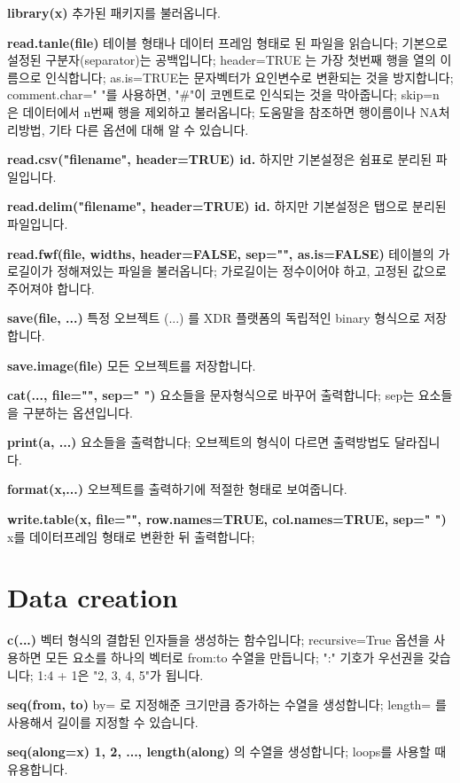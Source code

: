 \documentclass[landscape,twocolumn,letterpaper]{article}
\begin{document}
\textbf{library(x)} 추가된 패키지를 불러옵니다.

\textbf{read.tanle(file)} 테이블 형태나 데이터 프레임 형태로 된 파일을 읽습니다;
	기본으로 설정된 구분자(separator)는 공백입니다;
	header=TRUE 는 가장 첫번째 행을 열의 이름으로 인식합니다;
	as.is=TRUE는 문자벡터가 요인변수로 변환되는 것을 방지합니다;
	comment.char=" "를 사용하면, "\#"이 코멘트로 인식되는 것을 막아줍니다;
	skip=n 은 데이터에서 n번째 행을 제외하고 불러옵니다;
	도움말을 참조하면 행이름이나 NA처리방법, 기타 다른 옵션에 대해 알 수 있습니다.

\textbf{read.csv("filename", header=TRUE) id.} 하지만 기본설정은 쉼표로 분리된 파일입니다.

\textbf{read.delim("filename", header=TRUE) id.} 하지만 기본설정은 탭으로 분리된 파일입니다.

\textbf{read.fwf(file, widths, header=FALSE, sep="", as.is=FALSE)}
	테이블의 가로길이가 정해져있는 파일을 불러옵니다; 가로길이는 정수이어야 하고,
	고정된 값으로 주어져야 합니다.

\textbf{save(file, ...)} 특정 오브젝트 (...) 를 XDR 플랫폼의 독립적인 binary 형식으로 저장합니다.

\textbf{save.image(file) }모든 오브젝트를 저장합니다.

\textbf{cat(..., file="", sep=" ") }요소들을 문자형식으로 바꾸어 출력합니다; sep는  요소들을 구분하는
옵션입니다.

\textbf{print(a, ...)} 요소들을 출력합니다; 오브젝트의 형식이 다르면 출력방법도 달라집니다.

\textbf{format(x,...)} 오브젝트를 출력하기에 적절한 형태로 보여줍니다.

\textbf{write.table(x, file="", row.names=TRUE, col.names=TRUE, sep=" ")}
	x를 데이터프레임 형태로 변환한 뒤 출력합니다;

\section{Data creation}

\textbf{c(...)} 벡터 형식의 결합된 인자들을 생성하는 함수입니다;
	recursive=True 옵션을 사용하면 모든 요소를 하나의 벡터로 from:to 수열을 만듭니다; ":" 기호가 우선권을
갖습니다; 1:4 + 1은 "2, 3, 4, 5"가 됩니다.

\textbf{seq(from, to)} by= 로 지정해준 크기만큼 증가하는 수열을 생성합니다;
	length= 를 사용해서 길이를 지정할 수 있습니다.

\textbf{seq(along=x) 1, 2, ..., length(along)} 의 수열을 생성합니다; loops를 사용할 때 유용합니다.
\end{document}
